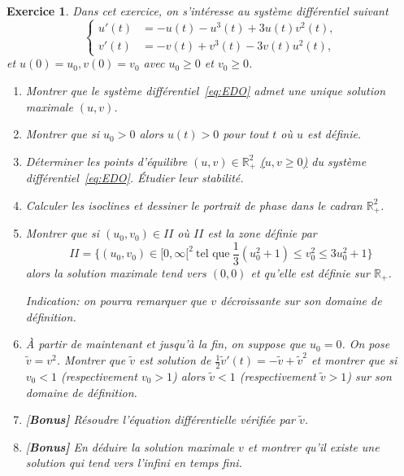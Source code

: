 \documentclass[11pt]{article}
\newcommand{\R}{\ensuremath{\mathbb R}}
\theoremstyle{exostyle}
\newtheorem{exercice}{Exercice}
\begin{document}
\begin{exercice}

  Dans cet exercice, on s’intéresse au système différentiel suivant 
  \begin{equation}
    \label{eq:EDO}
    \left\lbrace
      \begin{aligned}
        u'(t) &= -u(t) - u^3(t) + 3u(t) v^2(t), \\
        v'(t) &= -v(t) + v^3(t) - 3v(t) u^2(t), 
      \end{aligned}\right.
  \end{equation}
  et $u(0) = u_0, v(0) = v_0$ avec $u_0\geq 0$ et $v_0 \geq 0$.
  \begin{enumerate}
  \item Montrer que le système différentiel~\eqref{eq:EDO} admet une unique solution maximale $(u,v)$.
  \item Montrer que si $u_0>0$ alors $u(t) > 0$ pour tout $t$ où $u$ est définie. 
  \item Déterminer les points d’équilibre $(u,v) \in \R_+^{2}$ \underline{($u,v \geq 0$)} du système différentiel~\eqref{eq:EDO}.
    \'Etudier leur stabilité.
  \item Calculer les isoclines et dessiner le portrait de phase dans le cadran $\R_+^2$.
  \item Montrer que si $(u_0,v_0) \in II$ où $II$ est la zone définie par 
    \[
      II = \Big\lbrace (u_0,v_0) \in [0,\infty[^2 \ \text{tel que} \ \frac{1}{3}(u^2_0+ 1) \leq  v_0^2 \leq 3u_0^2+1 \Big\rbrace  
    \]
    alors la solution maximale tend vers $(0,0)$ et qu’elle est définie sur $\mathbb{R}_+$. 

    \emph{Indication:} on pourra remarquer que $v$ décroissante sur son domaine de définition.

  \item \`A partir de maintenant et jusqu'\`a la fin, on suppose que $u_0 = 0$. On pose $\tilde{v} = v^2$. Montrer que $\tilde{v}$ est solution de $\tfrac{1}{2}\tilde{v}'(t) = -\tilde{v}+\tilde{v}^2$ et montrer que si $v_0<1$ (respectivement $v_0>1$) alors $\tilde{v}<1$ (respectivement $\tilde{v}>1$) sur son domaine de définition.
  \item {[\bf Bonus]} Résoudre l’équation différentielle v\'erifi\'ee par $\tilde{v}$. 
  \item {[\bf Bonus]} En déduire la solution maximale $v$ et montrer qu’il existe une solution qui tend vers l’infini en temps fini.
  \end{enumerate}
\end{exercice}
\end{document}
